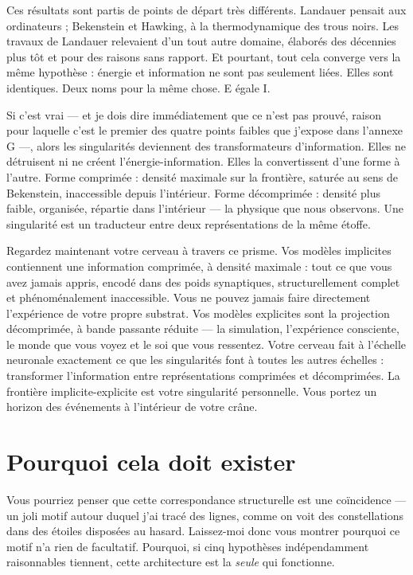 \documentclass[11pt, twoside, openright]{book}
\begin{document}
Ces résultats sont partis de points de départ très différents. Landauer pensait aux ordinateurs ; Bekenstein et Hawking, à la thermodynamique des trous noirs. Les travaux de Landauer relevaient d'un tout autre domaine, élaborés des décennies plus tôt et pour des raisons sans rapport. Et pourtant, tout cela converge vers la même hypothèse : énergie et information ne sont pas seulement liées. Elles sont identiques. Deux noms pour la même chose. E égale I.

Si c'est vrai --- et je dois dire immédiatement que ce n'est pas prouvé, raison pour laquelle c'est le premier des quatre points faibles que j'expose dans l'annexe G ---, alors les singularités deviennent des transformateurs d'information. Elles ne détruisent ni ne créent l'énergie-information. Elles la convertissent d'une forme à l'autre. Forme comprimée : densité maximale sur la frontière, saturée au sens de Bekenstein, inaccessible depuis l'intérieur. Forme décomprimée : densité plus faible, organisée, répartie dans l'intérieur --- la physique que nous observons. Une singularité est un traducteur entre deux représentations de la même étoffe.

Regardez maintenant votre cerveau à travers ce prisme. Vos modèles implicites contiennent une information comprimée, à densité maximale : tout ce que vous avez jamais appris, encodé dans des poids synaptiques, structurellement complet et phénoménalement inaccessible. Vous ne pouvez jamais faire directement l'expérience de votre propre substrat. Vos modèles explicites sont la projection décomprimée, à bande passante réduite --- la simulation, l'expérience consciente, le monde que vous voyez et le soi que vous ressentez. Votre cerveau fait à l'échelle neuronale exactement ce que les singularités font à toutes les autres échelles : transformer l'information entre représentations comprimées et décomprimées. La frontière implicite-explicite est votre singularité personnelle. Vous portez un horizon des événements à l'intérieur de votre crâne.

\section*{Pourquoi cela doit exister}

Vous pourriez penser que cette correspondance structurelle est une coïncidence --- un joli motif autour duquel j'ai tracé des lignes, comme on voit des constellations dans des étoiles disposées au hasard. Laissez-moi donc vous montrer pourquoi ce motif n'a rien de facultatif. Pourquoi, si cinq hypothèses indépendamment raisonnables tiennent, cette architecture est la \textit{seule} qui fonctionne.
\end{document}
